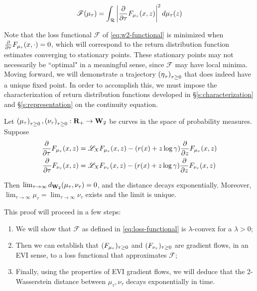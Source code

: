 \begin{equation}
  \label{eq:w2-functional}
  \mathscr{F}(\mu_\tau) =
  \int_{\returnspace}\left\lvert\partialderiv{}{\tau}\cdf[\mu_\tau](x,
  z)\right\rvert^2d\mu_\tau(z)
\end{equation}

Note that the loss functional $\mathscr{F}$ of \eqref{eq:w2-functional} is
minimized when $\partialderiv{}{\tau}\cdf[\mu_\tau](x,\cdot) = 0$, which will correspond
to the return distribution function estimates converging to stationary points.
These stationary points may not necessarily be ``optimal" in a meaningful sense,
since $\mathscr{F}$ may have local minima. Moving forward, we will demonstrate a
trajectory $\indexedabove{\tau}{\returnmeasure}$ that does indeed have a unique
fixed point. In order to accomplish this, we must impose the characterization
of return distribution functions developed in \S\ref{s:characterization} and
\S\ref{s:representation} on the continuity equation.

\begin{theorem}\label{thm:convergence}
  Let $\indexedabove{\tau}{\mu},\indexedabove{\tau}{\nu}:\mathbf{R}_+\to\wasserspace$
  be curves in the space of probability measures. Suppose
  \begin{align*}
    \partialderiv{}{\tau}\cdf[\mu_\tau](x, z) &= \mathscr{L}_X\cdf[\mu_\tau](x, z) -
                                     (r(x) +
                                     z\log\gamma)\partialderiv{}{z}\cdf[\mu_\tau](x,
                                     z)\\
    \partialderiv{}{\tau}\cdf[\nu_\tau](x, z) &= \mathscr{L}_X\cdf[\nu_\tau](x, z) -
                                     (r(x) +
                                     z\log\gamma)\partialderiv{}{z}\cdf[\nu_\tau](x,
                                     z)\\
  \end{align*}

  Then $\lim_{\tau\to\infty}\wassermetric(\mu_\tau,\nu_\tau) = 0$, and the
  distance decays exponentially. Moreover, $\lim_{\tau\to\infty}\mu_\tau =
  \lim_{\tau\to\infty}\nu_\tau$ exists and the limit is unique.
\end{theorem}

This proof will proceed in a few steps:
\begin{enumerate}
  \item\label{thm:convergence:convex} We will show that $\mathscr{F}$ as defined
    in \eqref{eq:loss-functional} is
    $\lambda$-convex for a $\lambda>0$;
  \item\label{thm:convergence:evi} Then we can establish that
    $(\cdf[\mu_\tau])_{\tau\geq 0}$ and $(\cdf[\nu_\tau])_{\tau\geq 0}$ are gradient
    flows, in an EVI sense, to a loss functional that approximates
    $\mathscr{F}$;
  \item\label{thm:convergence:convergence} Finally, using the properties of EVI
    gradient flows, we will deduce that the 2-Wasserstein distance between
    $\mu_\tau,\nu_\tau$
    decays exponentially in time.
\end{enumerate}

